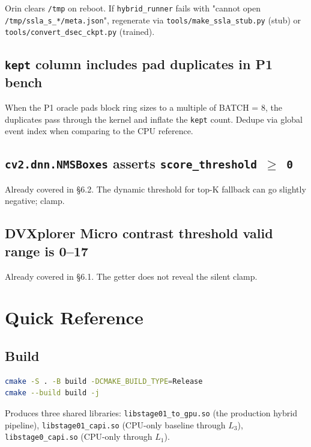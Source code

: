\documentclass[11pt,a4paper]{article}
\begin{document}
Orin clears \texttt{/tmp} on reboot. If \texttt{hybrid\_runner} fails
with "cannot open \texttt{/tmp/ssla\_s\_*/meta.json}", regenerate via
\texttt{tools/make\_ssla\_stub.py} (stub) or
\texttt{tools/convert\_dsec\_ckpt.py} (trained).

\subsection{\texttt{kept} column includes pad duplicates in P1 bench}

When the P1 oracle pads block ring sizes to a multiple of BATCH = 8,
the duplicates pass through the kernel and inflate the \texttt{kept}
count. Dedupe via global event index when comparing to the CPU
reference.

\subsection{\texttt{cv2.dnn.NMSBoxes} asserts \texttt{score\_threshold $\geq$ 0}}

Already covered in \S 6.2. The dynamic threshold for top-K fallback can
go slightly negative; clamp.

\subsection{DVXplorer Micro contrast threshold valid range is 0--17}

Already covered in \S 6.1. The getter does not reveal the silent clamp.

\section{Quick Reference}

\subsection{Build}

\begin{lstlisting}[language=Bash]
cmake -S . -B build -DCMAKE_BUILD_TYPE=Release
cmake --build build -j
\end{lstlisting}

Produces three shared libraries: \texttt{libstage01\_to\_gpu.so} (the
production hybrid pipeline), \texttt{libstage01\_capi.so} (CPU-only
baseline through \(L_3\)), \texttt{libstage0\_capi.so} (CPU-only
through \(L_1\)).
\end{document}
